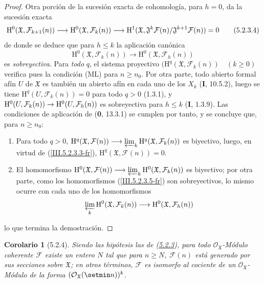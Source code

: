 \documentclass[10pt,oneside,openany]{book}
\theoremstyle{egaenv}\newtheorem*{env}{---}
\theoremstyle{egastatement}
\newtheorem*{corollary}{Corolario}
\theoremstyle{egadescription}
\newcommand{\oldpage}[2][]{\marginnote{\normalfont\scriptsize\textbf{#1}\,|\,#2}\ignorespaces}
\renewcommand{\leq}{\leqslant}
\renewcommand{\geq}{\geqslant}
\renewcommand{\to}{\mathchoice{\longrightarrow}{\rightarrow}{\rightarrow}{\rightarrow}}
\begin{document}
\begin{proof}
Otra porción de la sucesión exacta de cohomología, para $h=0$, da la sucesión
exacta
\begin{equation}
\mathrm H^0(\mathfrak X,\mathcal F_{k+1}(n))\to
\mathrm H^0(\mathfrak X,\mathcal F_k(n))\to
\mathrm H^1(\mathfrak X,
\mathfrak J^k\mathcal F(n)/\mathfrak J^{k+1}\mathcal F(n))=0
\tag{5.2.3.4}
\label{III.5.2.3.4-fr}
\end{equation}
de donde se deduce que para $h\leq k$ la aplicación canónica
\begin{equation}
\mathrm H^0(\mathfrak X,\mathcal F_k(n))\longrightarrow
\mathrm H^0(\mathfrak X,\mathcal F_h(n))
\tag{5.2.3.5}
\label{III.5.2.3.5-fr}
\end{equation}
es \emph{sobreyectiva}. Para \emph{todo} $q$, el sistema proyectivo
$(\mathrm H^q(\mathfrak X,\mathcal F_k(n))\quad(k\geq0)$ verifica pues la condición
(ML) para $n\geq n_0$. Por otra parte, todo abierto formal afín $U$ de $\mathfrak X$
es también un abierto afín en cada uno de los $X_k$ (\textbf{I}, 10.5.2), luego se tiene
$\mathrm H^q(U,\mathcal F_k(n))=0$ para todo $q>0$ (1.3.1), y
$\mathrm H^0(U,\mathcal F_k(n))\to\mathrm H^0(U,\mathcal F_h(n))$ es sobreyectiva
para $h\leq k$ (\textbf{I}, 1.3.9). Las condiciones de aplicación de (\textbf{0}, 13.3.1) se
cumplen por tanto, y se concluye que, para $n\geq n_0$:
\begin{enumerate}
\item[$1^\circ$] Para todo $q>0$,
$\mathrm H^q(\mathfrak X,\mathcal F(n))\longrightarrow
\varprojlim_k\mathrm H^q(\mathfrak X,\mathcal F_k(n))$
es biyectivo, luego, en virtud de (\ref{III.5.2.3.3-fr}),
$\mathrm H^q(\mathfrak X,\mathcal F(n))=0$.
\item[$2^\circ$] El homomorfismo
$\mathrm H^0(\mathfrak X,\mathcal F(n))\longrightarrow
\varprojlim_k\mathrm H^0(\mathfrak X,\mathcal F_k(n))$
es biyectivo; por otra parte, como los homomorfismos
(\ref{III.5.2.3.5-fr}) son sobreyectivos, lo mismo ocurre con cada uno de los
homomorfismos
\[
\varprojlim_k\mathrm H^0(\mathfrak X,\mathcal F_k(n))
\longrightarrow\mathrm H^0(\mathfrak X,\mathcal F_h(n))
\]
\end{enumerate}
lo que termina la demostración.
\end{proof}

\begin{corollary}[5.2.4]
\label{III.5.2.4-fr}
Siendo las hipótesis las de \textup{(\hyperref[III.5.2.3-fr]{5.2.3})}, para todo
$\mathcal O_{\mathfrak X}$-Módulo coherente $\mathcal F$ existe un entero $N$
tal que para $n\geq N$, $\mathcal F(n)$ está generado por sus secciones sobre
\oldpage[III]{153}
$\mathfrak X$; en otros términos, $\mathcal F$ es isomorfo al cociente de un
$\mathcal O_{\mathfrak X}$-Módulo de la forma
$(\mathcal O_{\mathfrak X}(\setmin n))^k$.
\end{corollary}
\end{document}
